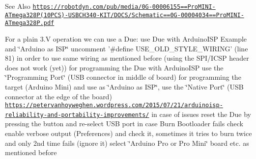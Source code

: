 \begin{DoxySeeAlso}{See Also}
\href{https://robotdyn.com/pub/media/0G-00006155==ProMINI-ATmega328P(10PCS)-USBCH340-KIT/DOCS/Schematic==0G-00004034==ProMINI-ATmega328P.pdf}{\tt https\-://robotdyn.\-com/pub/media/0\-G-\/00006155==\-Pro\-M\-I\-N\-I-\/\-A\-Tmega328\-P(10\-P\-C\-S)-\/\-U\-S\-B\-C\-H340-\/\-K\-I\-T/\-D\-O\-C\-S/\-Schematic==0\-G-\/00004034==\-Pro\-M\-I\-N\-I-\/\-A\-Tmega328\-P.\-pdf}
\end{DoxySeeAlso}
For a plain 3.\-V operation we can use a Due\-: use Due with Arduino\-I\-S\-P Example and \char`\"{}\-Arduino as I\-S\-P\char`\"{} uncomment '\#define U\-S\-E\-\_\-\-O\-L\-D\-\_\-\-S\-T\-Y\-L\-E\-\_\-\-W\-I\-R\-I\-N\-G' (line 81) in order to use same wiring as mentioned before (using the S\-P\-I/\-I\-C\-S\-P header does not work (yet)) for programming the Due with Arduino\-I\-S\-P use the \char`\"{}\-Programming Port\char`\"{} (U\-S\-B connector in middle of board) for programming the target (Arduino Mini) and use as \char`\"{}\-Arduino as I\-S\-P\char`\"{}, use the \char`\"{}\-Native Port\char`\"{} (U\-S\-B connector at the edge of the board) \href{https://petervanhoyweghen.wordpress.com/2015/07/21/arduinoisp-reliability-and-portability-improvements/}{\tt https\-://petervanhoyweghen.\-wordpress.\-com/2015/07/21/arduinoisp-\/reliability-\/and-\/portability-\/improvements/} in case of issues reset the Due by pressing the button and re-\/select U\-S\-B port in case Burn Bootloader fails check enable verbose output (Preferences) and check it, sometimes it tries to burn twice and only 2nd time fails (ignore it) select \char`\"{}\-Arduino Pro or Pro Mini\char`\"{} board etc. as mentioned before

